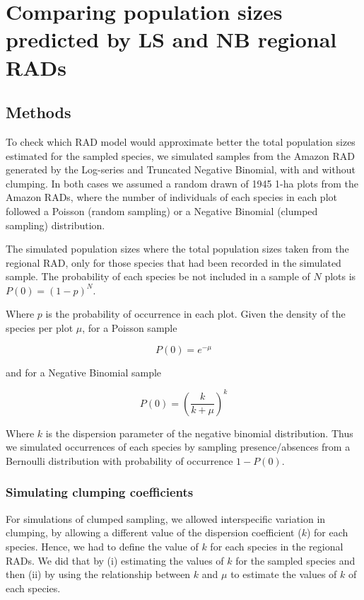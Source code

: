 \documentclass[12pt, A4]{article}\usepackage[]{graphicx}\usepackage[]{color}
\begin{document}
\section{Comparing population sizes predicted by LS and NB regional RADs}

\subsection*{Methods}

To check which RAD model would approximate better the total population sizes estimated
for the sampled species, we simulated samples from the Amazon RAD generated by the Log-series 
and Truncated Negative Binomial, with and without clumping. 
In both cases we assumed a random drawn of 1945 1-ha plots
from the Amazon RADs, where the number of individuals of each species
in each plot followed a Poisson (random sampling) or a Negative Binomial (clumped sampling)
distribution. 

The simulated population sizes where the total population sizes taken from
the regional RAD, only for those species that had been recorded 
in the simulated sample. 
The probability of each species be not included in a sample of $N$ plots is  $P(0)=(1-p)^N$.

Where $p$ is the probability of occurrence in each plot. 
Given the density of the species per plot $\mu$, 
for a Poisson sample 

\begin{equation}
  \label{eq:3}
  P(0) = e^{-\mu} 
\end{equation} 

and for a Negative Binomial sample

\begin{equation}
  \label{eq:2}
  P(0) = \left( \frac{k}{k+\mu} \right)^k 
\end{equation}

Where $k$ is the dispersion parameter of the negative binomial distribution.
Thus we simulated occurrences of each species by sampling presence/absences
from a Bernoulli distribution with probability of occurrence $1-P(0)$.

\subsubsection*{Simulating clumping coefficients}

For simulations of clumped sampling, 
we allowed interspecific variation in clumping, 
by allowing a different value of the dispersion coefficient ($k$) for each species.
Hence, we had to define the value of $k$ for each species in the regional
RADs. We did that by (i) estimating the values of $k$ for the sampled species and
then (ii) by using the relationship between $k$ and $\mu$ to estimate the values of $k$
of each species.
\end{document}
